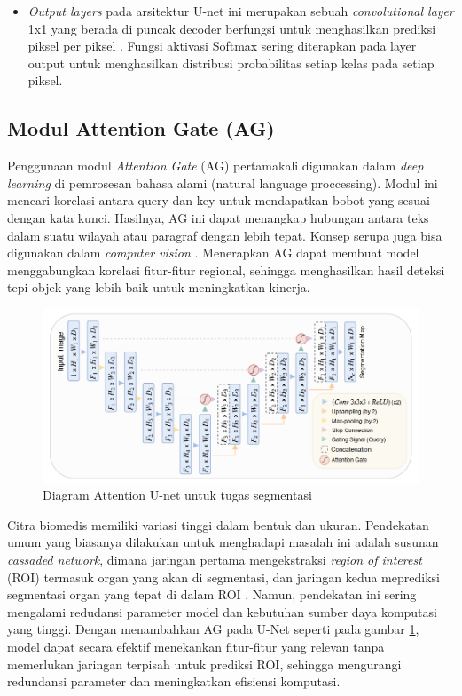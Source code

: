 \begin{itemize}
	\item \textit{Output layers}  pada arsitektur U-net ini merupakan sebuah \textit{convolutional layer} 1x1 yang berada di puncak decoder berfungsi untuk menghasilkan prediksi piksel per piksel \cite{huang_fully_2022,azad_medical_2022}. Fungsi aktivasi Softmax sering diterapkan pada layer output untuk menghasilkan distribusi probabilitas setiap kelas pada setiap piksel. 
	
	
\end{itemize}



\subsection{Modul Attention Gate (AG)}

\noindent Penggunaan modul \textit{Attention Gate} (AG) pertamakali digunakan dalam \textit{deep learning} di pemrosesan bahasa alami (natural language proccessing)\cite{azad_medical_2022}. Modul ini mencari korelasi antara query dan key untuk mendapatkan bobot yang sesuai dengan kata kunci. Hasilnya, AG ini dapat menangkap hubungan antara teks dalam suatu wilayah atau paragraf dengan lebih tepat. Konsep serupa juga bisa digunakan dalam \textit{computer vision} \cite{huang_fully_2022}. Menerapkan AG dapat membuat model menggabungkan korelasi fitur-fitur regional, sehingga menghasilkan hasil deteksi tepi objek yang lebih baik untuk meningkatkan kinerja.

\begin{figure}[H]
	\centering
	\includegraphics[scale=.7]{gambar/AG-U.png}
	\caption{Diagram Attention U-net untuk tugas segmentasi}
	\label{fig:Attention-U-net}
\end{figure}

\noindent Citra biomedis memiliki variasi tinggi dalam bentuk dan ukuran. Pendekatan umum yang biasanya dilakukan untuk menghadapi masalah ini adalah susunan \textit{cassaded network}, dimana jaringan pertama  mengekstraksi \textit{region of interest} (ROI) termasuk organ yang akan di segmentasi, dan jaringan kedua meprediksi segmentasi organ yang tepat di dalam ROI \cite{oktay_attention_2018}. Namun, pendekatan ini sering mengalami redudansi parameter model dan kebutuhan sumber daya komputasi yang tinggi. Dengan menambahkan AG pada U-Net seperti pada gambar \ref{fig:Attention-U-net}, model dapat secara efektif menekankan fitur-fitur yang relevan tanpa memerlukan jaringan terpisah untuk prediksi ROI, sehingga mengurangi redundansi parameter dan meningkatkan efisiensi komputasi\cite{azad_medical_2022}.


